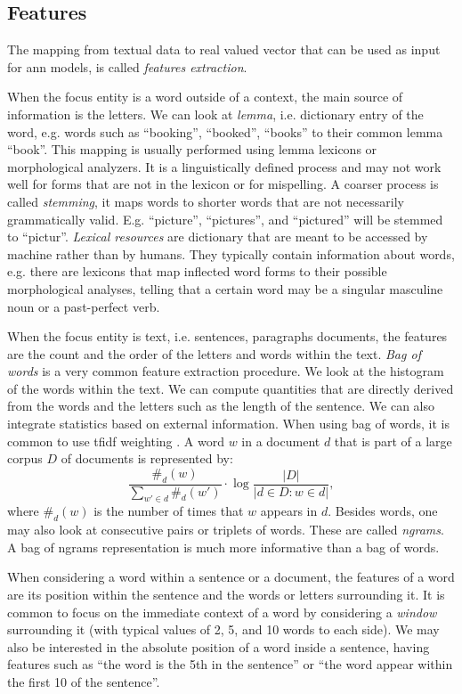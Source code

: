 \subsection{Features}
The mapping from textual data to real valued vector that can be used
as input for \ac{ann} models, is called \emph{features extraction}.

When the focus entity is a word outside of a context, the main source
of information is the letters. We can look at \emph{lemma},
i.e. dictionary entry of the word, e.g. words such as ``booking'',
``booked'', ``books'' to their common lemma ``book''. This mapping is
usually performed using lemma lexicons or morphological analyzers. It
is a linguistically defined process and may not work well for forms
that are not in the lexicon or for mispelling. A coarser process is
called \emph{stemming}, it maps words to shorter words that are
not necessarily grammatically valid. E.g. ``picture'', ``pictures'',
and ``pictured'' will be stemmed to ``pictur''. \emph{Lexical
  resources} are dictionary that are meant to be accessed by machine
rather than by humans. They typically contain information about words,
e.g. there are lexicons that map inflected word forms to their
possible morphological analyses, telling that a certain word may be a
singular masculine noun or a past-perfect verb.

When the focus entity is text, i.e. sentences, paragraphs documents,
the features are the count and the order of the letters and words
within the text. \emph{Bag of words} is a very common feature
extraction procedure. We look at the histogram of the words within the
text. We can compute quantities that are directly derived from
the words and the letters such as the length of the sentence. We can
also integrate statistics based on external information. When using
bag of words, it is common to use \ac{tfidf} weighting
\cite{manning_introduction_2008}. A word $w$ in a document $d$ that is
part of a large corpus $D$ of documents is represented by:
\begin{equation*}
  \frac{\#_d(w)}{\sum_{w'\in d}\#_d(w')}\cdot\log\frac{|D|}{|d\in
    D:w\in d|},
\end{equation*}
where $\#_d(w)$ is the number of times that $w$ appears in
$d$. Besides words, one may also look at consecutive pairs or triplets
of words. These are called \emph{ngrams}. A bag of ngrams
representation is much more informative than a bag of words.

When considering a word within a sentence or a document, the features
of a word are its position within the sentence and the words or
letters surrounding it. It is common to focus on the immediate context
of a word by considering a \emph{window} surrounding it (with typical
values of 2, 5, and 10 words to each side). We may also be interested
in the absolute position of a word inside a sentence, having features
such as ``the word is the 5th in the sentence'' or ``the word appear
within the first 10 of the sentence''.

